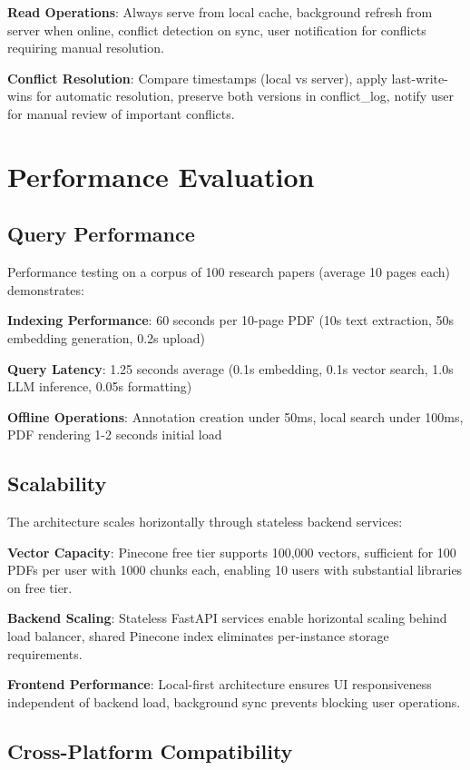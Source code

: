 \documentclass[conference]{IEEEtran}
\begin{document}
\textbf{Read Operations}: Always serve from local cache, background refresh from server when online, conflict detection on sync, user notification for conflicts requiring manual resolution.

\textbf{Conflict Resolution}: Compare timestamps (local vs server), apply last-write-wins for automatic resolution, preserve both versions in conflict\_log, notify user for manual review of important conflicts.

\section{Performance Evaluation}

\subsection{Query Performance}

Performance testing on a corpus of 100 research papers (average 10 pages each) demonstrates:

\textbf{Indexing Performance}: 60 seconds per 10-page PDF (10s text extraction, 50s embedding generation, 0.2s upload)

\textbf{Query Latency}: 1.25 seconds average (0.1s embedding, 0.1s vector search, 1.0s LLM inference, 0.05s formatting)

\textbf{Offline Operations}: Annotation creation under 50ms, local search under 100ms, PDF rendering 1-2 seconds initial load

\subsection{Scalability}

The architecture scales horizontally through stateless backend services:

\textbf{Vector Capacity}: Pinecone free tier supports 100,000 vectors, sufficient for 100 PDFs per user with 1000 chunks each, enabling 10 users with substantial libraries on free tier.

\textbf{Backend Scaling}: Stateless FastAPI services enable horizontal scaling behind load balancer, shared Pinecone index eliminates per-instance storage requirements.

\textbf{Frontend Performance}: Local-first architecture ensures UI responsiveness independent of backend load, background sync prevents blocking user operations.

\subsection{Cross-Platform Compatibility}
\end{document}
